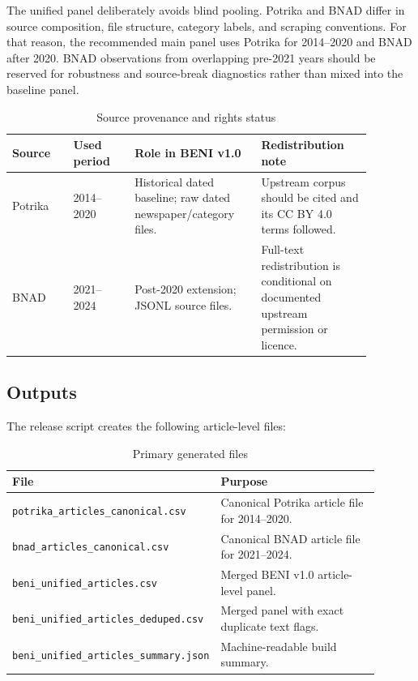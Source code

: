 \documentclass[11pt]{article}
\begin{document}
The unified panel deliberately avoids blind pooling. Potrika and BNAD differ in source composition, file structure, category labels, and scraping conventions. For that reason, the recommended main panel uses Potrika for 2014--2020 and BNAD after 2020. BNAD observations from overlapping pre-2021 years should be reserved for robustness and source-break diagnostics rather than mixed into the baseline panel.

\begin{table}[htbp]
\centering
\caption{Source provenance and rights status}
\label{tab:source-provenance}
\small
\begin{tabular}{L{0.15\linewidth}L{0.15\linewidth}L{0.31\linewidth}L{0.27\linewidth}}
\toprule
Source & Used period & Role in BENI v1.0 & Redistribution note\\
\midrule
Potrika & 2014--2020 & Historical dated baseline; raw dated newspaper/category files. & Upstream corpus should be cited and its CC BY 4.0 terms followed.\\
BNAD & 2021--2024 & Post-2020 extension; JSONL source files. & Full-text redistribution is conditional on documented upstream permission or licence.\\
\bottomrule
\end{tabular}
\end{table}

\subsection{Outputs}

The release script creates the following article-level files:

\begin{table}[htbp]
\centering
\caption{Primary generated files}
\begin{tabular}{L{0.42\linewidth}L{0.48\linewidth}}
\toprule
File & Purpose\\
\midrule
\texttt{potrika\_articles\_canonical.csv} & Canonical Potrika article file for 2014--2020.\\
\texttt{bnad\_articles\_canonical.csv} & Canonical BNAD article file for 2021--2024.\\
\texttt{beni\_unified\_articles.csv} & Merged BENI v1.0 article-level panel.\\
\texttt{beni\_unified\_articles\_deduped.csv} & Merged panel with exact duplicate text flags.\\
\texttt{beni\_unified\_articles\_summary.json} & Machine-readable build summary.\\
\bottomrule
\end{tabular}
\end{table}
\end{document}
